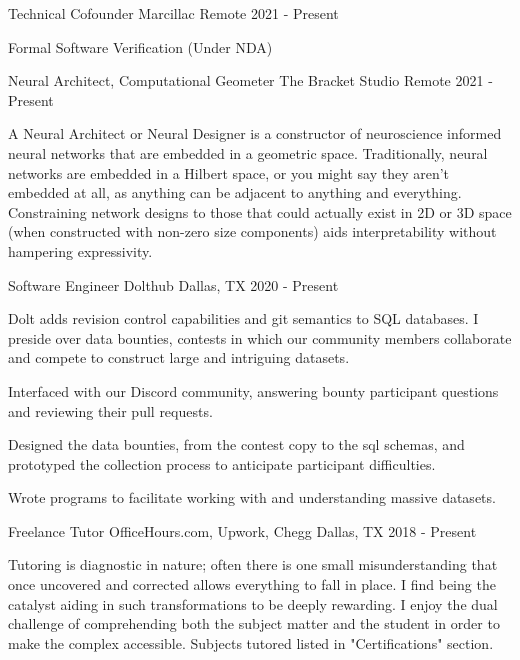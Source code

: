 \begin{cventries}
    \cventry
        {Technical Cofounder}
        {Marcillac}
        {Remote}
        {2021 - Present}
        {
            \begin{cvitems}
                \item{Formal Software Verification (Under NDA)}
            \end{cvitems}
        }
    \cventry
        {Neural Architect, Computational Geometer}
        {The Bracket Studio}
        {Remote}
        {2021 - Present}
        {
            \begin{cvparagraph}
A Neural Architect or Neural Designer is a constructor of neuroscience informed neural networks that are embedded in a geometric space. Traditionally, neural networks are embedded in a Hilbert space, or you might say they aren't embedded at all, as anything can be adjacent to anything and everything. Constraining network designs to those that could actually exist in 2D or 3D space (when constructed with non-zero size components) aids interpretability without hampering expressivity.
            \end{cvparagraph}
        }
    \cventry
        {Software Engineer}
        {Dolthub}
        {Dallas, TX}
        {2020 - Present}
        {
            \begin{cvparagraph}
                Dolt adds revision control capabilities and git semantics to SQL databases. I preside over data bounties, contests in which our community members collaborate and compete to construct large and intriguing datasets.
            \end{cvparagraph}
            \begin{cvitems}
                \item{Interfaced with our Discord community, answering bounty participant questions and reviewing their pull requests.}
                \item{Designed the data bounties, from the contest copy to the sql schemas, and prototyped the collection process to anticipate participant difficulties.}
                \item{Wrote programs to facilitate working with and understanding massive datasets.}
            \end{cvitems}
        }
    \cventry
        {Freelance Tutor}
        {OfficeHours.com, Upwork, Chegg}
        {Dallas, TX}
        {2018 - Present}
        {
            \begin{cvparagraph}
                Tutoring is diagnostic in nature; often there is one small misunderstanding that once uncovered and corrected allows everything to fall in place. I find being the catalyst aiding in such transformations to be deeply rewarding. I enjoy the dual challenge of comprehending both the subject matter and the student in order to make the complex accessible. Subjects tutored listed in "Certifications" section.

\end{cvparagraph}}
\end{cventries}
